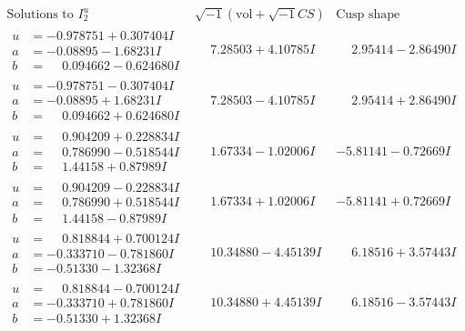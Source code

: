 \documentclass[1p]{elsarticle_modified}
\theoremstyle{definition}
\newcommand{\I}{\sqrt{-1}}
\begin{document}
$$\begin{array}{c|c|c}  
\text{Solutions to }I^u_{2}& \I (\text{vol} + \sqrt{-1}CS) & \text{Cusp shape}\\
 \hline 
\begin{aligned}
u &= -0.978751 + 0.307404 I \\
a &= -0.08895 - 1.68231 I \\
b &= \phantom{-}0.094662 - 0.624680 I\end{aligned}
 & \phantom{-}7.28503 + 4.10785 I & \phantom{-}2.95414 - 2.86490 I \\ \hline\begin{aligned}
u &= -0.978751 - 0.307404 I \\
a &= -0.08895 + 1.68231 I \\
b &= \phantom{-}0.094662 + 0.624680 I\end{aligned}
 & \phantom{-}7.28503 - 4.10785 I & \phantom{-}2.95414 + 2.86490 I \\ \hline\begin{aligned}
u &= \phantom{-}0.904209 + 0.228834 I \\
a &= \phantom{-}0.786990 - 0.518544 I \\
b &= \phantom{-}1.44158 + 0.87989 I\end{aligned}
 & \phantom{-}1.67334 - 1.02006 I & -5.81141 - 0.72669 I \\ \hline\begin{aligned}
u &= \phantom{-}0.904209 - 0.228834 I \\
a &= \phantom{-}0.786990 + 0.518544 I \\
b &= \phantom{-}1.44158 - 0.87989 I\end{aligned}
 & \phantom{-}1.67334 + 1.02006 I & -5.81141 + 0.72669 I \\ \hline\begin{aligned}
u &= \phantom{-}0.818844 + 0.700124 I \\
a &= -0.333710 - 0.781860 I \\
b &= -0.51330 - 1.32368 I\end{aligned}
 & \phantom{-}10.34880 - 4.45139 I & \phantom{-}6.18516 + 3.57443 I \\ \hline\begin{aligned}
u &= \phantom{-}0.818844 - 0.700124 I \\
a &= -0.333710 + 0.781860 I \\
b &= -0.51330 + 1.32368 I\end{aligned}
 & \phantom{-}10.34880 + 4.45139 I & \phantom{-}6.18516 - 3.57443 I \\ \hline\begin{aligned}

\end{aligned}
\end{array}$$
\end{document}
